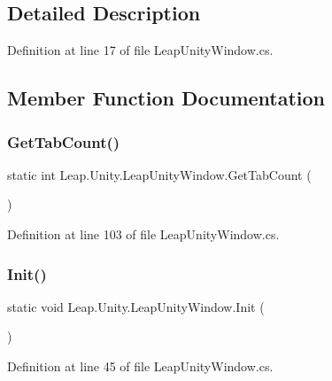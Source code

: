 \subsection{Detailed Description}


Definition at line 17 of file Leap\+Unity\+Window.\+cs.



\subsection{Member Function Documentation}
\mbox{\label{class_leap_1_1_unity_1_1_leap_unity_window_aa6f053a75ac307fc50ef1bdc9bcf5fed}} 
\subsubsection{\texorpdfstring{GetTabCount()}{GetTabCount()}}
{\footnotesize\ttfamily static int Leap.\+Unity.\+Leap\+Unity\+Window.\+Get\+Tab\+Count (\begin{DoxyParamCaption}{ }\end{DoxyParamCaption})\hspace{0.3cm}{\ttfamily [static]}}



Definition at line 103 of file Leap\+Unity\+Window.\+cs.

\mbox{\label{class_leap_1_1_unity_1_1_leap_unity_window_a23365de0fb2b614ce387eb2b97feb8a9}} 
\subsubsection{\texorpdfstring{Init()}{Init()}}
{\footnotesize\ttfamily static void Leap.\+Unity.\+Leap\+Unity\+Window.\+Init (\begin{DoxyParamCaption}{ }\end{DoxyParamCaption})\hspace{0.3cm}{\ttfamily [static]}}



Definition at line 45 of file Leap\+Unity\+Window.\+cs.

